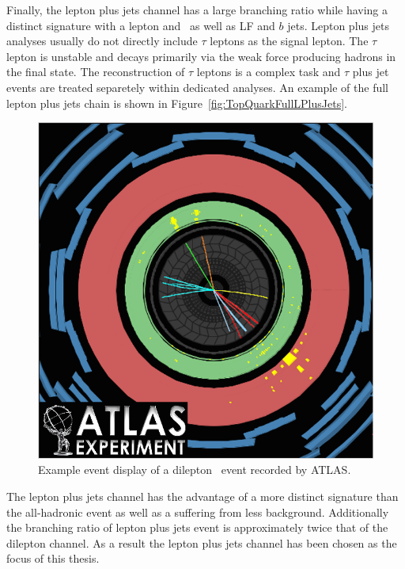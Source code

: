Finally, the lepton plus jets channel has a large branching ratio while having a distinct signature with a lepton and \met\ as well as LF and $b$ jets. Lepton plus jets analyses usually do not directly include $\tau$ leptons as the signal lepton. The $\tau$ lepton is unstable and decays primarily via the weak force producing hadrons in the final state. The reconstruction of $\tau$ leptons is a complex task and $\tau$ plus jet events are treated separetely within dedicated analyses. An example of the full lepton plus jets chain is shown in Figure~\ref{fig:TopQuarkFullLPlusJets}.

\begin{figure}[thbp]
  \centering
  \includegraphics[height=0.30\textheight]{PartTopQuark/Diagrams/atlas-2010-063-fig_09.png}
  \caption{Example event display of a dilepton \ttbar\ event recorded by ATLAS.} \label{fig:TopQuarkEventDisplay}
\end{figure}

The lepton plus jets channel has the advantage of a more distinct signature than the all-hadronic event as well as a suffering from less background. Additionally the branching ratio of lepton plus jets event is approximately twice that of the dilepton channel. As a result the lepton plus jets channel has been chosen as the focus of this thesis.

